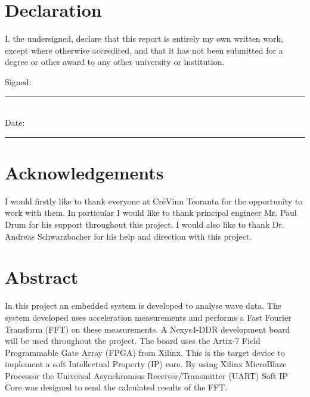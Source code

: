 \documentclass[12pt,a4paper]{report} %
\begin{document}
\chapter*{Declaration}
I, the undersigned, declare that this report is entirely my own written work, except where otherwise accredited, and that it has not been submitted for a degree or other award to any other university or institution.\par\vspace{\baselineskip}
\noindent Signed:\\
\rule{25em}{0.5pt}\\
\noindent Date:\\
\rule{25em}{0.5pt}
\chapter*{Acknowledgements}
I would firstly like to thank everyone at CréVinn Teoranta for the opportunity to work with them.
In particular I would like to thank principal engineer Mr. Paul Drum for his support throughout this project.
I would also like to thank Dr. Andreas Schwarzbacher for his help and direction with this project.

\chapter*{Abstract}
In this project an embedded system is developed to analyse wave data.
The system developed uses acceleration measurements and performs a Fast Fourier Transform (FFT) on these measurements.
A Nexys4-DDR development board will be used throughout the project.
The board uses the Artix-7 Field Programmable Gate Array (FPGA) from Xilinx.
This is the target device to implement a soft Intellectual Property (IP) core.
By using Xilinx MicroBlaze Processor the Universal Asynchronous Receiver/Transmitter (UART) Soft IP Core was designed to send the calculated results of the FFT. 
\end{document}
